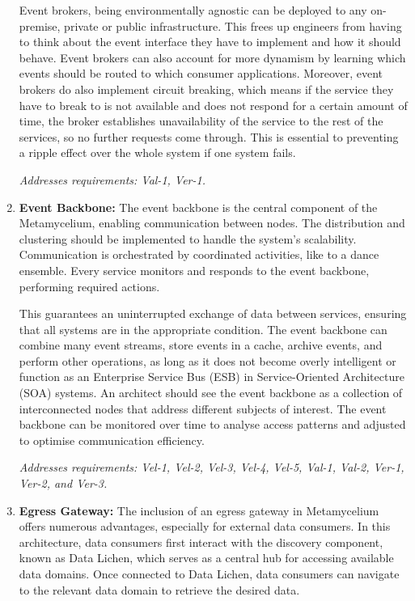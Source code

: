 \documentclass[journal]{IEEEtran}
\begin{document}
\begin{enumerate}
    Event brokers, being environmentally agnostic can be deployed to any on-premise, private or public infrastructure. This frees up engineers from having to think about the event interface they have to implement and how it should behave. Event brokers can also account for more dynamism by learning which events should be routed to which consumer applications. Moreover, event brokers do also implement circuit breaking, which means if the service they have to break to is not available and does not respond for a certain amount of time, the broker establishes unavailability of the service to the rest of the services, so no further requests come through. This is essential to preventing a ripple effect over the whole system if one system fails. 
    
    \textit{Addresses requirements: Val-1, Ver-1.} 

    \item \textbf{Event Backbone:} The event backbone is the central component of the Metamycelium, enabling communication between nodes. The distribution and clustering should be implemented to handle the system's scalability. Communication is orchestrated by coordinated activities, like to a dance ensemble. Every service monitors and responds to the event backbone, performing required actions. 
    
    This guarantees an uninterrupted exchange of data between services, ensuring that all systems are in the appropriate condition. The event backbone can combine many event streams, store events in a cache, archive events, and perform other operations, as long as it does not become overly intelligent or function as an Enterprise Service Bus (ESB) in Service-Oriented Architecture (SOA) systems. An architect should see the event backbone as a collection of interconnected nodes that address different subjects of interest. The event backbone can be monitored over time to analyse access patterns and adjusted to optimise communication efficiency.

    \textit{Addresses requirements: Vel-1, Vel-2, Vel-3, Vel-4, Vel-5, Val-1, Val-2, Ver-1, Ver-2, and Ver-3.} 
    

    \item \textbf{Egress Gateway:} The inclusion of an egress gateway in Metamycelium offers numerous advantages, especially for external data consumers. In this architecture, data consumers first interact with the discovery component, known as Data Lichen, which serves as a central hub for accessing available data domains. Once connected to Data Lichen, data consumers can navigate to the relevant data domain to retrieve the desired data.


\end{enumerate}
\end{document}
